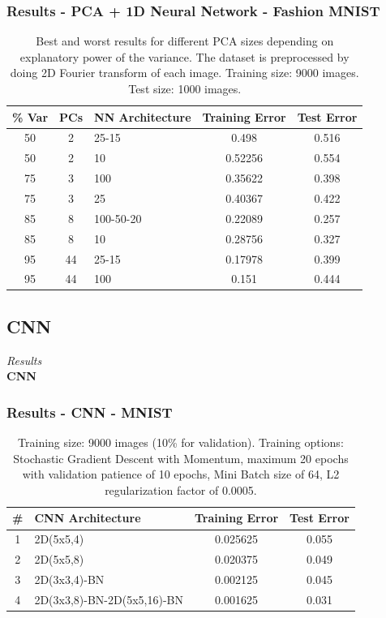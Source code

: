 \documentclass{beamer}
\begin{document}
\begin{frame}
\frametitle{Results - PCA + 1D Neural Network - Fashion MNIST}
\begin{table}[hbt]
  \begin{tabular}{|cc|l|c|c|}
  	\hline
    \% Var & PCs & NN Architecture & Training Error & Test Error \\
    \hline
    \hline
    50 &2 & 25-15 & 0.498     & 0.516\\
    50 & 2 & 10 & 0.52256     & 0.554\\
    \hline
    75 & 3 & 100 & 0.35622    &  0.398\\
    75 & 3 & 25 & 0.40367   &   0.422\\
    \hline
    85 & 8 & 100-50-20 & 0.22089    &  0.257\\
    85 & 8 & 10 & 0.28756    &  0.327\\
    \hline
    95 & 44 & 25-15 & 0.17978    &  0.399 \\
    95 & 44 & 100 & 0.151   &   0.444\\
    \hline
  \end{tabular}
    \vspace{1em}
  \caption{Best and worst results for different PCA sizes depending on explanatory power of the variance. The dataset is preprocessed by doing 2D Fourier transform of each image. Training size: 9000 images. Test size: 1000 images.}
\end{table}
\end{frame}

\subsection{CNN}

\begin{frame}[standout]
	\centering
	\textit{Results}\\
	\vspace{2em}
	\textbf{CNN}
\end{frame}

\begin{frame}
\frametitle{Results - CNN - MNIST}
\begin{table}[hbt]
  \begin{tabular}{|c|l|c|c|}
  	\hline
    \# & CNN Architecture & Training Error & Test Error\\
    \hline
    \hline
        1 & 2D(5x5,4)  &                 0.025625   &  0.055\\     
    2 & 2D(5x5,8)  &               0.020375  &   0.049  \\   
    3 & 2D(3x3,4)-BN      &          0.002125  &   0.045   \\  
    4 & 2D(3x3,8)-BN-2D(5x5,16)-BN      &        0.001625  &   0.031 \\
    \hline
  \end{tabular}
  \vspace{2em}
  \caption{{Training size: 9000 images (10\% for validation). Training options: Stochastic Gradient Descent with Momentum, maximum 20 epochs with validation patience of 10 epochs, Mini Batch size of 64, L2 regularization factor of 0.0005.}}
\end{table}
\end{frame}
\end{document}
